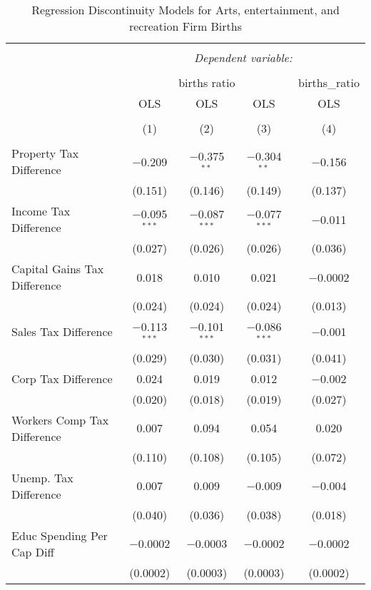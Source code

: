 
\begin{table}[!htbp] \centering 
  \caption{Regression Discontinuity Models for  Arts, entertainment, and recreation Firm Births} 
  \label{71rd} 
\begin{tabular}{@{\extracolsep{5pt}}lcccc} 
\\[-1.8ex]\hline 
\hline \\[-1.8ex] 
 & \multicolumn{4}{c}{\textit{Dependent variable:}} \\ 
\cline{2-5} 
\\[-1.8ex] & \multicolumn{3}{c}{births ratio} & births\_ratio \\ 
 & OLS & OLS & OLS & OLS \\ 
\\[-1.8ex] & (1) & (2) & (3) & (4)\\ 
\hline \\[-1.8ex] 
 Property Tax Difference & $-$0.209 & $-$0.375$^{**}$ & $-$0.304$^{**}$ & $-$0.156 \\ 
  & (0.151) & (0.146) & (0.149) & (0.137) \\ 
  Income Tax Difference & $-$0.095$^{***}$ & $-$0.087$^{***}$ & $-$0.077$^{***}$ & $-$0.011 \\ 
  & (0.027) & (0.026) & (0.026) & (0.036) \\ 
  Capital Gains Tax Difference & 0.018 & 0.010 & 0.021 & $-$0.0002 \\ 
  & (0.024) & (0.024) & (0.024) & (0.013) \\ 
  Sales Tax Difference & $-$0.113$^{***}$ & $-$0.101$^{***}$ & $-$0.086$^{***}$ & $-$0.001 \\ 
  & (0.029) & (0.030) & (0.031) & (0.041) \\ 
  Corp Tax Difference & 0.024 & 0.019 & 0.012 & $-$0.002 \\ 
  & (0.020) & (0.018) & (0.019) & (0.027) \\ 
  Workers Comp Tax Difference & 0.007 & 0.094 & 0.054 & 0.020 \\ 
  & (0.110) & (0.108) & (0.105) & (0.072) \\ 
  Unemp. Tax Difference & 0.007 & 0.009 & $-$0.009 & $-$0.004 \\ 
  & (0.040) & (0.036) & (0.038) & (0.018) \\ 
  Educ Spending Per Cap Diff & $-$0.0002 & $-$0.0003 & $-$0.0002 & $-$0.0002 \\ 
  & (0.0002) & (0.0003) & (0.0003) & (0.0002) \\ 

\end{tabular}
\end{table}
